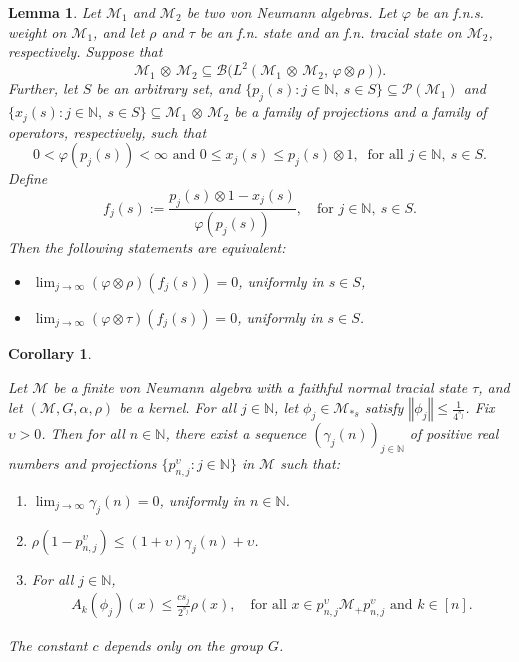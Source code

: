 \documentclass[10pt,a4paper]{amsart}
\newtheorem{lem}{Lemma}
\newtheorem{cor}{Corollary}
\newcommand{\CM}{\mathcal{M}}
\def\N{\mathbb N}
\newcommand{\norm}[1]{\left\Vert#1\right\Vert}
\newcommand{\ups}{\upsilon}
\begin{document}
\begin{lem}\label{uniform conv lem}
Let \( \CM_1 \) and \( \CM_2 \) be two von Neumann algebras. Let \( \varphi \) be an f.n.s. weight on \( \CM_1 \), and let \( \rho \) and \( \tau \) be an f.n. state and an f.n. tracial state on \( \CM_2 \), respectively.
Suppose that
\[
\CM_1 \,\otimes\, \CM_2 \subseteq \mathcal{B}\big(L^2(\CM_1 \,\otimes\, \CM_2,\, \varphi \otimes \rho)\big).
\]
Further, let $S$ be an arbitrary set, and $
\{ p_j{(s)} : j\in \mathbb{N},~ s \in S  \} \subseteq \mathcal{P}(\CM_1)$ and  $
\{ x_j{(s)} : j\in \mathbb{N},~ s \in S \} \subseteq \CM_1 \,\otimes\, \CM_2
$ be a  family  of projections and a 
 family of operators, respectively, such that 
$$ 0< \varphi(p_j(s)) < \infty \text{ and } 0\leq x_j(s) \leq p_j(s) \otimes 1, ~ \text{ for all } j \in \mathbb{N}, ~ s \in S.
$$
Define
\[
f_j(s) := \frac{p_j(s) \otimes 1 - x_j(s)}{\varphi(p_j(s))}, \quad \text{for } j \in \mathbb{N}, ~s\in S.
\]
Then the following statements are equivalent:
\begin{itemize}\setlength\itemsep{.7em}
    \item[(1)] \( \displaystyle \lim_{j \to \infty} (\varphi \otimes \rho)(f_j(s)) = 0 \), uniformly in \( s \in S \),
    \item[(2)] \( \displaystyle \lim_{j \to \infty} (\varphi \otimes \tau)(f_j(s)) = 0 \), uniformly in \( s \in S \).
\end{itemize}
\end{lem}

\begin{cor}\label{maximal ineq for averages-cor}


Let $\CM$ be a finite von Neumann algebra with a faithful normal tracial state $\tau$, and let $(\CM, G, \alpha, \rho)$ be a kernel. For all $j \in \N$, let $\phi_j \in \CM_{* s}$ satisfy $\norm{\phi_j} \leq \frac{1}{4^{s_j}}$. Fix $ \ups > 0$. Then for all $n \in \N$, there exist a sequence $\left(\gamma_j(n)\right)_{j \in \N}$ of positive real numbers and projections $\{p^{\ups}_{n,j} : j \in \N\}$ in $\CM$ such that:
	\begin{enumerate}\setlength\itemsep{.7em} 
		\item $ \displaystyle \lim_{j \to \infty} \gamma_j(n) = 0$, uniformly in $n \in \N$.  
		\item $\rho(1 - p^{ \ups}_{n,j}) \leq (1 + \ups)\gamma_j(n) + \ups$.  
		\item For all $j \in \N$,
		\begin{align}\label{max-cond}
		    A_k(\phi_j)(x) \leq  \frac{c s_j}{2^{s_j}} \rho(x), \quad \text{for all } x \in p^{ \ups}_{n,j} \CM_+ p^{\ups}_{n,j} \text{ and } k \in [n].
		\end{align}
	\end{enumerate}
	The constant $c$ depends only on the group $G$.






\end{cor}
\end{document}
